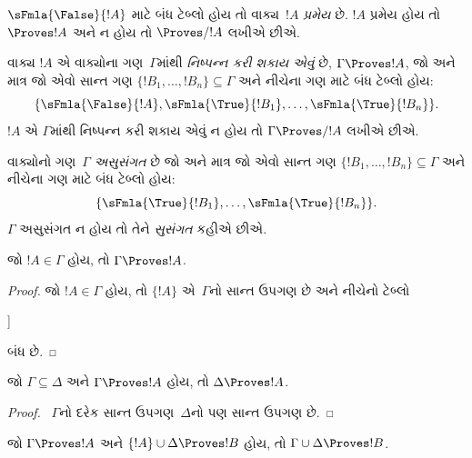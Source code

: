 \begin{defn}[પ્રમેયો]
$\sFmla{\False}{!A}$ માટે બંધ ટેબ્લો હોય તો વાક્ય~$!A$
\emph{પ્રમેય} છે. $!A$ પ્રમેય હોય તો $\Proves !A$ અને ન હોય તો
$\Proves/ !A$ લખીએ છીએ.
\end{defn}

\begin{defn}[નિષ્પન્નક્ષમતા]
વાક્ય $!A$ એ વાક્યોના ગણ~$\Gamma$માંથી
\emph{નિષ્પન્ન કરી શકાય એવું} છે, $\Gamma \Proves !A$, જો અને માત્ર જો એવો સાન્ત
ગણ $\{!B_1, \dots, !B_n\} \subseteq \Gamma$ અને નીચેના ગણ માટે બંધ
ટેબ્લો હોય:
\[
\{
  \sFmla{\False}{!A},
  \sFmla{\True}{!B_1}, \dots,
  \sFmla{\True}{!B_n}
  \}.
\]
$!A$ એ $\Gamma$માંથી નિષ્પન્ન કરી શકાય એવું ન હોય તો $\Gamma \Proves/ !A$
લખીએ છીએ.
\end{defn}

\begin{defn}[સુસંગતતા]
વાક્યોનો ગણ~$\Gamma$ \emph{અસુસંગત} છે જો અને માત્ર જો એવો સાન્ત
ગણ $\{!B_1, \dots, !B_n\} \subseteq \Gamma$ અને નીચેના ગણ માટે બંધ
ટેબ્લો હોય:
\[
\{
  \sFmla{\True}{!B_1}, \dots,
  \sFmla{\True}{!B_n}
  \}.
\]
$\Gamma$ અસુસંગત ન હોય તો તેને \emph{સુસંગત} કહીએ છીએ.
\end{defn}

\begin{prop}[સ્વવાચકતા]
જો $!A \in \Gamma$ હોય, તો $\Gamma \Proves !A$.
\end{prop}

\begin{proof}
જો $!A \in \Gamma$ હોય, તો $\{!A\}$ એ~$\Gamma$નો સાન્ત ઉપગણ છે અને
નીચેનો ટેબ્લો
\begin{oltableau}
  [\sFmla{\False}{\formula{A}}, just = \TAss
    [\sFmla{\True}{\formula{A}}, just = \TAss,close]
  ]
\end{oltableau}
બંધ છે.
\end{proof}


\begin{prop}
જો $\Gamma \subseteq \Delta$ અને $\Gamma \Proves !A$ હોય, તો
$\Delta \Proves !A$.
\end{prop}

\begin{proof}
~$\Gamma$નો દરેક સાન્ત ઉપગણ~$\Delta$નો પણ સાન્ત ઉપગણ છે.
\end{proof}

\begin{prop}[પરંપરિતતા]
જો $\Gamma \Proves !A$ અને $\{!A\} \cup \Delta \Proves !B$ હોય, તો
$\Gamma \cup \Delta \Proves !B$.
\end{prop}

